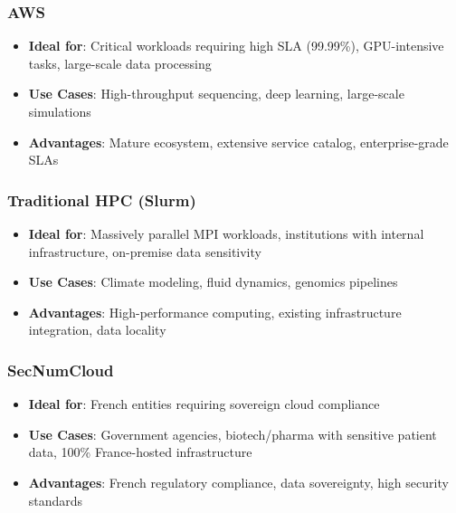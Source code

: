 \documentclass[11pt,a4paper]{article}
\begin{document}
	\subsubsection{AWS}
	
	\begin{itemize}
		\item \textbf{Ideal for}: Critical workloads requiring high SLA (99.99\%), GPU-intensive tasks, large-scale data processing
		\item \textbf{Use Cases}: High-throughput sequencing, deep learning, large-scale simulations
		\item \textbf{Advantages}: Mature ecosystem, extensive service catalog, enterprise-grade SLAs
	\end{itemize}
	
	\subsubsection{Traditional HPC (Slurm)}
	
	\begin{itemize}
		\item \textbf{Ideal for}: Massively parallel MPI workloads, institutions with internal infrastructure, on-premise data sensitivity
		\item \textbf{Use Cases}: Climate modeling, fluid dynamics, genomics pipelines
		\item \textbf{Advantages}: High-performance computing, existing infrastructure integration, data locality
	\end{itemize}
	
	\subsubsection{SecNumCloud}
	
	\begin{itemize}
		\item \textbf{Ideal for}: French entities requiring sovereign cloud compliance
		\item \textbf{Use Cases}: Government agencies, biotech/pharma with sensitive patient data, 100\% France-hosted infrastructure
		\item \textbf{Advantages}: French regulatory compliance, data sovereignty, high security standards
	\end{itemize}
	
	\newpage
	
\end{document}
